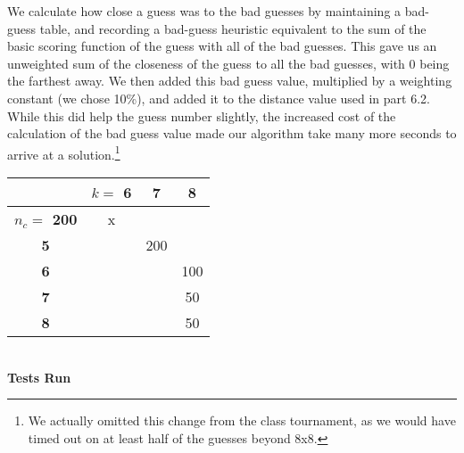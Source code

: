 \documentclass[11pt,twocolumn]{article}
\begin{document}
We calculate how close a guess was to the bad guesses by maintaining a bad-guess table, and recording a bad-guess heuristic equivalent to the sum of the basic scoring function of the guess with all of the bad guesses. This gave us an unweighted sum of the closeness of the guess to all the bad guesses, with 0 being the farthest away. We then added this bad guess value, multiplied by a weighting constant (we chose 10\%), and added it to the distance value used in part 6.2. While this did help the guess number slightly, the increased cost of the calculation of the bad guess value made our algorithm take many more seconds to arrive at a solution.\footnote{We actually omitted this change from the class tournament, as we would have timed out on at least half of the guesses beyond 8x8.}

\begin{center}
\begin{tabular}{|c|c|c|c|}
\hline
        &\bf $k= $ 6 &\bf 7 &\bf 8 \\
\hline
\bf $n_c = $ 200 & x   &   &   \\
\hline
\bf 5       &       &200&   \\
\hline
\bf 6       &       &   &100 \\
\hline
\bf 7       &       &   &50 \\
\hline
\bf 8       &       &   &50 \\
\hline
\end{tabular}\\
\bf Tests Run\rm\\
\end{center}
\end{document}
